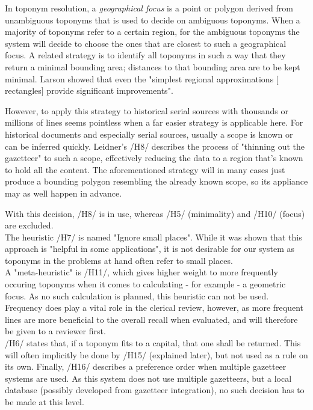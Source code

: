 \documentclass[11pt]{article}
\begin{document}
In toponym resolution, a \emph{geographical focus} is a point or polygon derived from unambiguous toponyms that is used to decide on ambiguous toponyms. When a majority of toponyms refer to a certain region, for the ambiguous toponyms the system will decide to choose the ones that are closest to such a geographical focus. A related strategy is to identify all toponyms in such a way that they return a minimal bounding area; distances to that bounding area are to be kept minimal. Larson showed that even the "simplest regional approximations $[$rectangles$]$ provide significant improvements". \cite[p. 11]{larson04}

However, to apply this strategy to historical serial sources with thousands or millions of lines seems pointless when a far easier strategy is applicable here. For historical documents and especially serial sources, usually a scope is known or can be inferred quickly. Leidner's /H8/ describes the process of "thinning out the gazetteer" to such a scope, effectively reducing the data to a region that's known to hold all the content. The aforementioned strategy will in many cases just produce a bounding polygon resembling the already known scope, so its appliance may as well happen in advance.

With this decision, /H8/ is in use, whereas /H5/ (minimality) and /H10/ (focus) are excluded.\\

The heuristic /H7/ is named "Ignore small places". While it was shown that this approach is "helpful in some applications"\cite[p. 105]{leidner07}, it is not desirable for our system as toponyms in the problems at hand often refer to small places.\\

A "meta-heuristic"\cite[p. 107]{leidner07} is /H11/, which gives higher weight to more frequently occuring toponyms when it comes to calculating - for example - a geometric focus. As no such calculation is planned, this heuristic can not be used. Frequency does play a vital role in the clerical review, however, as more frequent lines are more beneficial to the overall recall when evaluated, and will therefore be given to a reviewer first.\\

/H6/ states that, if a toponym fits to a capital, that one shall be returned. This will often implicitly be done by /H15/ (explained later), but not used as a rule on its own. Finally, /H16/ describes a preference order when multiple gazetteer systems are used. As this system does not use multiple gazetteers, but a local database (possibly developed from gazetteer integration), no such decision has to be made at this level.
\end{document}
